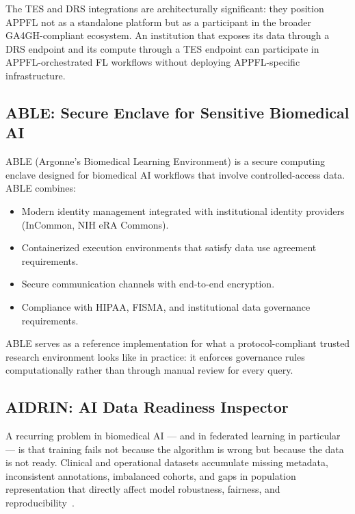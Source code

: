 \documentclass[conference]{IEEEtran}
\begin{document}
The TES and DRS integrations are architecturally significant: they position APPFL not as a standalone platform but as a participant in the broader GA4GH-compliant ecosystem. An institution that exposes its data through a DRS endpoint and its compute through a TES endpoint can participate in APPFL-orchestrated FL workflows without deploying APPFL-specific infrastructure.

\subsection{ABLE: Secure Enclave for Sensitive Biomedical AI}

ABLE (Argonne's Biomedical Learning Environment) is a secure computing enclave designed for biomedical AI workflows that involve controlled-access data. ABLE combines:
\begin{itemize}
    \item Modern identity management integrated with institutional identity providers (InCommon, NIH eRA Commons).
    \item Containerized execution environments that satisfy data use agreement requirements.
    \item Secure communication channels with end-to-end encryption.
    \item Compliance with HIPAA, FISMA, and institutional data governance requirements.
\end{itemize}

ABLE serves as a reference implementation for what a protocol-compliant trusted research environment looks like in practice: it enforces governance rules computationally rather than through manual review for every query.

\subsection{AIDRIN: AI Data Readiness Inspector}

A recurring problem in biomedical AI — and in federated learning in particular — is that training fails not because the algorithm is wrong but because the data is not ready. Clinical and operational datasets accumulate missing metadata, inconsistent annotations, imbalanced cohorts, and gaps in population representation that directly affect model robustness, fairness, and reproducibility~\cite{hiniduma2024aidrin}.
\end{document}
